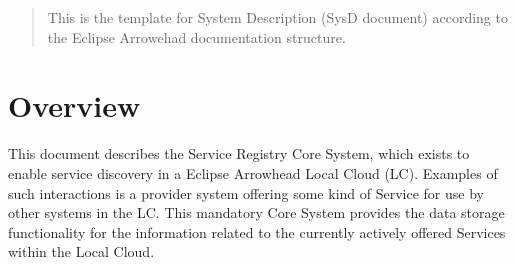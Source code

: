 \documentclass[a4paper]{arrowhead}
\begin{document}
\ArrowheadDate{\today}
\ArrowheadSetup

\begin{center}
  \vspace*{1cm}
  \huge{\arrowtitle}

  \vspace*{0.2cm}
  \LARGE{\arrowtype}
  \vspace*{1cm}

  \vspace*{\fill}


  \vspace*{1cm}
  \vspace*{\fill}

  \begin{abstract}
    This is the template for System Description (SysD document)
    according to the Eclipse Arrowehad documentation structure. 
  \end{abstract}

  \vspace*{1cm}

 \end{center}

\newpage

\tableofcontents
\newpage

\section{Overview}
\label{sec:overview}
\color{black}
This document describes the Service Registry Core System, which exists to enable service discovery in a Eclipse Arrowhead Local Cloud (LC). Examples of such interactions is a provider system offering some kind of Service for use by other systems in the LC. This mandatory Core System provides the data storage functionality for the information related to the currently actively offered Services within the Local Cloud.
\end{document}
